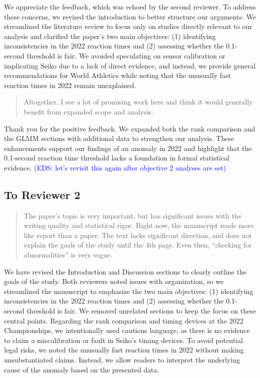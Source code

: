 \documentclass[12pt]{article}
\newcommand{\eds}[1]{\textcolor{blue}{(EDS: #1)}}
\newenvironment{comment}%
{\begin{quotation}\noindent\small\it\color{darkblue}\ignorespaces%
}{\end{quotation}}
\begin{document}
We appreciate the feedback, which was echoed by the second
reviewer. To address these concerns, we revised the introduction to
better structure our arguments. We streamlined the literature review
to focus only on studies directly relevant to our analysis and
clarified the paper’s two main objectives: (1) identifying
inconsistencies in the 2022 reaction times and (2) assessing whether
the 0.1-second threshold is fair. We avoided speculating on sensor
calibration or implicating Seiko due to a lack of direct evidence, and
instead, we provide general recommendations for World Athletics while
noting that the unusually fast reaction times in 2022 remain
unexplained.


\begin{comment}
Altogether, I see a lot of promising work here and think it would generally
benefit from expanded scope and analysis.
\end{comment}

Thank you for the positive feedback. We expanded both the rank
comparison and the GLMM sections with additional data to strengthen our
analysis. These enhancements support our findings of an anomaly in
2022 and highlight that the 0.1-second reaction time threshold lacks a
foundation in formal statistical evidence.
\eds{let's revisit this again after objective 2 analyses are set}


\subsection*{To Reviewer 2}


\begin{comment}
The paper’s topic is very important, but has significant issues with the writing
quality and statistical rigor. Right now, the manuscript reads more like report
than a paper. The text lacks significant direction, and does not explain the
goals of the study until the 4th page. Even then, “checking for abnormalities”
is very vague.
\end{comment}


We have revised the Introduction and Discussion sections to clearly
outline the goals of the study. Both reviewers noted issues with
organization, so we streamlined the manuscript to emphasize the two
main objectives: (1) identifying inconsistencies in the 2022 reaction
times and (2) assessing whether the 0.1-second threshold is fair. We
removed unrelated sections to keep the focus on these central
points. Regarding the rank comparison and timing devices at the 2022
Championships, we intentionally used cautious language, as there is no
evidence to claim a miscalibration or fault in Seiko’s timing
devices. To avoid potential legal risks, we noted the unusually fast
reaction times in 2022 without making unsubstantiated claims. Instead,
we allow readers to interpret the underlying cause of the anomaly
based on the presented data.
\end{document}
